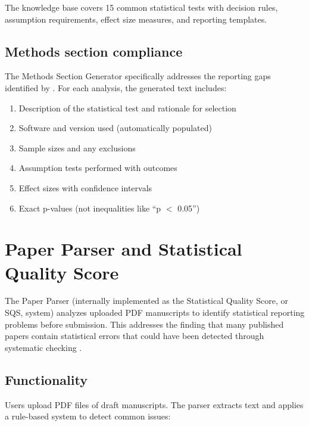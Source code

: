 \documentclass[article]{jss}
\begin{document}
The knowledge base covers 15 common statistical tests with decision rules, assumption requirements, effect size measures, and reporting templates.

\subsection{Methods section compliance}

The Methods Section Generator specifically addresses the reporting gaps identified by \citet{appelbaum2018jars}. For each analysis, the generated text includes:

\begin{enumerate}
\item Description of the statistical test and rationale for selection
\item Software and version used (automatically populated)
\item Sample sizes and any exclusions
\item Assumption tests performed with outcomes
\item Effect sizes with confidence intervals
\item Exact p-values (not inequalities like ``p $<$ 0.05'')
\end{enumerate}


\section{Paper Parser and Statistical Quality Score} \label{sec:parser}

The Paper Parser (internally implemented as the Statistical Quality Score, or SQS, system) analyzes uploaded PDF manuscripts to identify statistical reporting problems before submission. This addresses the finding that many published papers contain statistical errors that could have been detected through systematic checking \citep{bakker2011misreporting}.

\subsection{Functionality}

Users upload PDF files of draft manuscripts. The parser extracts text and applies a rule-based system to detect common issues:
\end{document}
